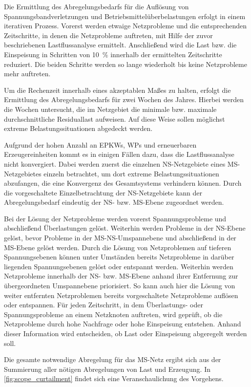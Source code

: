 Die Ermittlung des Abregelungsbedarfs für die Auflösung von Spannungsbandverletzungen und Betriebsmittelüberbelastungen erfolgt in einem iterativen Prozess.
Vorerst werden etwaige Netzprobleme und die entsprechenden Zeitschritte, in denen die Netzprobleme auftreten, mit Hilfe der zuvor beschriebenen Lastflussanalyse ermittelt.
Anschließend wird die Last bzw. die Einspeisung in Schritten von \SI{10}{\percent} innerhalb der ermittelten Zeitschritte reduziert.
Die beiden Schritte werden so lange wiederholt bis keine Netzprobleme mehr auftreten.\medskip

Um die Rechenzeit innerhalb eines akzeptablen Maßes zu halten, erfolgt die Ermittlung des Abregelungsbedarfs für zwei Wochen des Jahres.
Hierbei werden die Wochen untersucht, die im Netzgebiet die minimale bzw. maximale durchschnittliche Residuallast aufweisen.
Auf diese Weise sollen möglichst extreme Belastungssituationen abgedeckt werden.\medskip

Aufgrund der hohen Anzahl an \glspl{EPKW}, \glspl{WP} und erneuerbaren Erzeugereinheiten kommt es in einigen Fällen dazu, dass die Lastflussanalyse nicht konvergiert.
Dabei werden zuerst die einzelnen \gls{NS}-Netzgebiete eines \gls{MS}-Netzgebietes einzeln betrachtet, um dort extreme Belastungssituationen abzufangen, die eine Konvergenz des Gesamtsystems verhindern können.
Durch die vorgeschaltete Einzelbetrachtung der \gls{NS}-Netzgebiete kann der Abregelungsbedarf eindeutig der \gls{NS}- bzw. \gls{MS}-Ebene zugeordnet werden.\medskip

Bei der Lösung der Netzprobleme werden vorerst Spannungsprobleme und abschließend Überlastungen gelöst.
Weiterhin werden Probleme in der \gls{NS}-Ebene gelöst, bevor Probleme in der \gls{MS}-\gls{NS}-Umspannebene und abschließend in der \gls{MS}-Ebene gelöst werden.
Durch die Lösung von Netzproblemen auf tieferen Spannungsebenen können unter Umständen bereits Netzprobleme in darüber liegenden Spannungsebenen gelöst oder entspannt werden.
Weiterhin werden Netzprobleme innerhalb der \gls{NS}- bzw. \gls{MS}-Ebene anhand ihrer Entfernung zur übergeordneten Umspannebene priorisiert.
So kann auch hier die Lösung von weiter entfernten Netzproblemen bereits vorgeschaltete Netzprobleme auflösen oder entspannen.
Für jeden Zeitschritt, in dem Überlastungs- oder Spannungsprobleme an einem Netzknoten auftreten, wird geprüft, ob die Netzprobleme durch hohe Nachfrage oder hohe Einspeisung entstehen.
Anhand dieser Information wird entscheiden, ob Last oder Einspeisung abgeregelt werden soll.\medskip

Die gesamte notwendige Abregelung für das \gls{MS}-Netz ergibt sich aus der Summierung aller nötigen Abregelungen von Last und Erzeugung.
In \autoref{fig:scope_curtailment} findet sich eine Veranschaulichung des Vorgehens.



